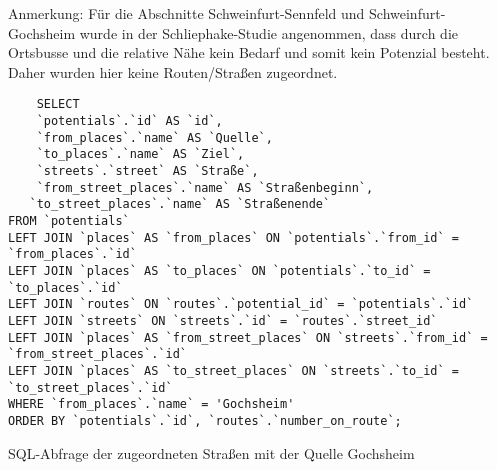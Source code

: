 \newline
\newline
Anmerkung: Für die Abschnitte Schweinfurt-Sennfeld und Schweinfurt-Gochsheim wurde in der Schliephake-Studie angenommen, dass durch die Ortsbusse und die relative Nähe kein Bedarf und somit kein Potenzial besteht. Daher wurden hier keine Routen/Straßen zugeordnet.
\newline
\begin{listing}[htbp]
\begin{verbatim}
    SELECT 
	`potentials`.`id` AS `id`,
	`from_places`.`name` AS `Quelle`, 
	`to_places`.`name` AS `Ziel`,
	`streets`.`street` AS `Straße`,
	`from_street_places`.`name` AS `Straßenbeginn`,
   `to_street_places`.`name` AS `Straßenende`
FROM `potentials`
LEFT JOIN `places` AS `from_places` ON `potentials`.`from_id` = `from_places`.`id`
LEFT JOIN `places` AS `to_places` ON `potentials`.`to_id` = `to_places`.`id`
LEFT JOIN `routes` ON `routes`.`potential_id` = `potentials`.`id`
LEFT JOIN `streets` ON `streets`.`id` = `routes`.`street_id`
LEFT JOIN `places` AS `from_street_places` ON `streets`.`from_id` = `from_street_places`.`id`
LEFT JOIN `places` AS `to_street_places` ON `streets`.`to_id` = `to_street_places`.`id`
WHERE `from_places`.`name` = 'Gochsheim'
ORDER BY `potentials`.`id`, `routes`.`number_on_route`;
\end{verbatim}
\caption{SQL-Abfrage der zugeordneten Straßen mit der Quelle Gochsheim}\label{lst-rt-gochsheim}
\end{listing}


